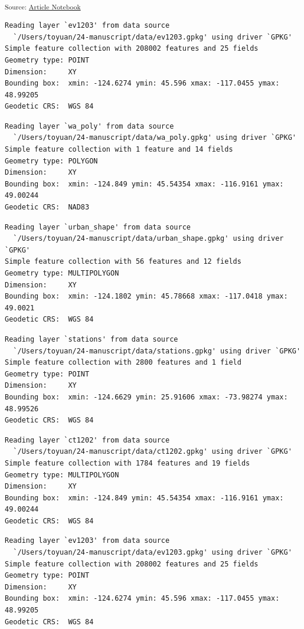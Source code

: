 \documentclass[
  letterpaper,
  DIV=11,
  numbers=noendperiod]{scrartcl}
\begin{document}
\textsubscript{Source:
\href{https://h-christy.github.io/24-manuscript/index.qmd.html}{Article
Notebook}}

\begin{verbatim}
Reading layer `ev1203' from data source 
  `/Users/toyuan/24-manuscript/data/ev1203.gpkg' using driver `GPKG'
Simple feature collection with 208002 features and 25 fields
Geometry type: POINT
Dimension:     XY
Bounding box:  xmin: -124.6274 ymin: 45.596 xmax: -117.0455 ymax: 48.99205
Geodetic CRS:  WGS 84
\end{verbatim}

\begin{verbatim}
Reading layer `wa_poly' from data source 
  `/Users/toyuan/24-manuscript/data/wa_poly.gpkg' using driver `GPKG'
Simple feature collection with 1 feature and 14 fields
Geometry type: POLYGON
Dimension:     XY
Bounding box:  xmin: -124.849 ymin: 45.54354 xmax: -116.9161 ymax: 49.00244
Geodetic CRS:  NAD83
\end{verbatim}

\begin{verbatim}
Reading layer `urban_shape' from data source 
  `/Users/toyuan/24-manuscript/data/urban_shape.gpkg' using driver `GPKG'
Simple feature collection with 56 features and 12 fields
Geometry type: MULTIPOLYGON
Dimension:     XY
Bounding box:  xmin: -124.1802 ymin: 45.78668 xmax: -117.0418 ymax: 49.0021
Geodetic CRS:  WGS 84
\end{verbatim}

\begin{verbatim}
Reading layer `stations' from data source 
  `/Users/toyuan/24-manuscript/data/stations.gpkg' using driver `GPKG'
Simple feature collection with 2800 features and 1 field
Geometry type: POINT
Dimension:     XY
Bounding box:  xmin: -124.6629 ymin: 25.91606 xmax: -73.98274 ymax: 48.99526
Geodetic CRS:  WGS 84
\end{verbatim}

\begin{verbatim}
Reading layer `ct1202' from data source 
  `/Users/toyuan/24-manuscript/data/ct1202.gpkg' using driver `GPKG'
Simple feature collection with 1784 features and 19 fields
Geometry type: MULTIPOLYGON
Dimension:     XY
Bounding box:  xmin: -124.849 ymin: 45.54354 xmax: -116.9161 ymax: 49.00244
Geodetic CRS:  WGS 84
\end{verbatim}

\begin{verbatim}
Reading layer `ev1203' from data source 
  `/Users/toyuan/24-manuscript/data/ev1203.gpkg' using driver `GPKG'
Simple feature collection with 208002 features and 25 fields
Geometry type: POINT
Dimension:     XY
Bounding box:  xmin: -124.6274 ymin: 45.596 xmax: -117.0455 ymax: 48.99205
Geodetic CRS:  WGS 84
\end{verbatim}
\end{document}
